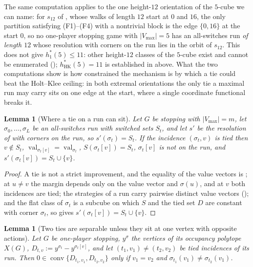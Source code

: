 \documentclass[11pt]{article}
\theoremstyle{plain}
\newtheorem{lemma}[theorem]{Lemma}
\theoremstyle{definition}
\DeclareMathOperator{\val}{val}
\newcommand{\Vmax}{V_{\max}}
\begin{document}
The same computation applies to the one height-$12$ orientation of the
$5$-cube we can name: for $s_{12}$ of , whose
walks of length $12$ start at $0$ and $16$, the only partition
satisfying (F1)--(F4) with a nontrivial block is the edge $\{0,16\}$ at
the start $0$, so no one-player stopping game with $|\Vmax|=5$ has an
all-switches run \emph{of length $12$} whose resolution with corners on
the run lies in the orbit of $s_{12}$. This does not give $h^{\ast}_{1}(5)\le11$: other
height-$12$ classes of the $5$-cube exist and cannot be enumerated
(); $h^{\ast}_{\mathrm{HK}}(5)=11$ is established
in  above. What the two computations show is how constrained the
mechanism is by which a tie could beat the Holt--Klee ceiling: in both
extremal orientations the only tie a maximal run may carry sits on one
edge at the start, where a single coordinate functional breaks it.

\begin{lemma}[Where a tie on a run can sit]\label{lem:tie-partner}
Let $G$ be stopping with $|\Vmax|=m$, let $\sigma_0,\dots,\sigma_L$ be an
all-switches run with switched sets $S_t$, and let $s'$ be the resolution
of  with corners on the run, so
$s'(\sigma_t)=S_t$. If the incidence $(\sigma_t,v)$ is tied then
$v\notin S_t$, $\val_{\sigma_t[v]}=\val_{\sigma_t}$, $S(\sigma_t[v])=S_t$,
$\sigma_t[v]$ is not on the run, and $s'(\sigma_t[v])=S_t\cup\{v\}$.
\end{lemma}

\begin{proof}
A tie is not a strict improvement, and the equality of the value vectors
is ; at $u\ne v$ the margin depends only on the value
vector and $\sigma(u)$, and at $v$ both incidences are tied; the
strategies of a run carry pairwise distinct value vectors
(); and the flat class of $\sigma_t$ is a subcube on
which $S$ and the tied set $D$ are constant with corner $\sigma_t$, so
 gives $s'(\sigma_t[v])=S_t\cup\{v\}$.
\end{proof}

\begin{lemma}[Two ties are separable unless they sit at one vertex with opposite actions]\label{lem:two-ties}
Let $G$ be one-player stopping, $y^{\sigma}$ the vertices of its occupancy
polytope $X(G)$, $D_{t,v}:=y^{\sigma_t}-y^{\sigma_t[v]}$, and let
$(t_1,v_1)\ne(t_2,v_2)$ be tied incidences of its run. Then
$0\in\operatorname{conv}\{D_{t_1,v_1},D_{t_2,v_2}\}$ only if $v_1=v_2$ and
$\sigma_{t_1}(v_1)\ne\sigma_{t_2}(v_1)$.
\end{lemma}
\end{document}
